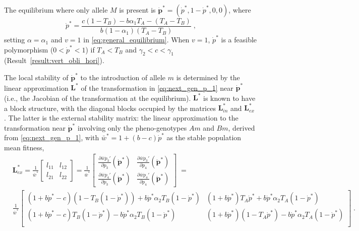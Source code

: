 \documentclass[12pt]{extarticle}
\let\vec\mathbf
\newcommand{\cl}{\mathbf{L}}
\begin{document}
\begin{appendices}
The equilibrium where only allele $M$ is present is  $\vec{\dot{p}^*} = (\dot{p}^*, 1-\dot{p}^*, 0, 0)$, where
\begin{equation} \label{eq:p_dot_star_alpha_1}
\dot{p}^*=
\frac{c(1-T_B) - b \alpha_1 T_A - (T_A - T_B)}{b(1-\alpha_1)(T_A-T_B)} \;,
\end{equation}
setting $\alpha=\alpha_1$ and $v=1$ in \autoref{eq:general_equilibrium}.
When $v=1$, $\dot p^*$ is a feasible polymorphism ($0 < \dot{p}^* < 1$) if $T_A<T_B$ and $\gamma_2<c<\gamma_1$ (Result~\ref{result:vert_obli_hori}).

The local stability of $\vec{\dot{p}^*}$ to the introduction of allele $m$ is determined by the linear approximation $\cl^*$ of the transformation in \autoref{eq:next_gen_p_1} near $\vec{\dot{p}^*}$ (i.e., the Jacobian of the transformation at the equilibrium).
$\cl^*$ is known to have a block structure, with the diagonal blocks occupied by the matrices $\cl^*_{in}$ and $\cl^*_{ex}$ \citep{Liberman1986modifiers,Altenberg2017} .
The latter is the external stability matrix: the linear approximation to the transformation near $\vec{\dot{p}^*}$ involving only the pheno-genotypes $Am$ and $Bm$, derived from \autoref{eq:next_gen_p_1}, with $\bar{w}^*=1+(b-c)\dot{p}^*$ as the stable population mean fitness,
\begin{equation} \label{eq:external_stability_matrix}
\begin{aligned}
&\cl^*_{ex} = 
 \frac{1}{\bar{w}^*} \begin{bmatrix}
	 l_{1 1} &
	 l_{1 2} \\
	 l_{2 1} &
	 l_{2 2} 
\end{bmatrix} = 
\frac{1}{\bar{w}^*} \begin{bmatrix}
\frac{\partial\bar{w}\dot{p}_3'}{\partial \dot{p}_3}(\vec{\dot{p}}^*) &
\frac{\partial\bar{w}\dot{p}_3'}{\partial \dot{p}_4}(\vec{\dot{p}}^*) \\
\frac{\partial\bar{w}\dot{p}_4'}{\partial \dot{p}_3}(\vec{\dot{p}}^*) &
\frac{\partial\bar{w}\dot{p}_4'}{\partial \dot{p}_4}(\vec{\dot{p}}^*) 
\end{bmatrix} \;= \\
& \frac{1}{\bar{w}^*} \begin{bmatrix}
		(1+b \dot{p}^* -c)(1-T_B(1-\dot{p}^*)) + b \dot{p}^* \alpha_2 T_B (1-\dot{p}^*) & 
		(1+b \dot{p}^*) T_A \dot{p}^* + b \dot{p}^* \alpha_2 T_A(1-\dot{p}^*) \\
		(1+b \dot{p}^* - c) T_B(1-\dot{p}^*) - b \dot{p}^* \alpha_2 T_B (1-\dot{p}^*) &
		(1+b \dot{p}^*) (1-T_A \dot{p}^*) - b \dot{p}^* \alpha_2 T_A (1-\dot{p}^*) \\
  	\end{bmatrix} \;.
\end{aligned}
\end{equation}


\end{appendices}
\end{document}

